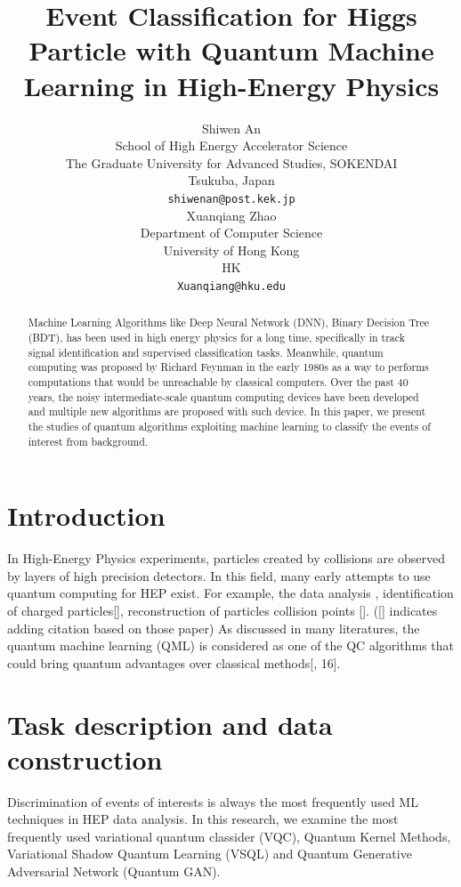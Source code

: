 \documentclass{article}
\title{Event Classification for Higgs Particle with Quantum Machine Learning in 
      High-Energy Physics}
\author{
 Shiwen An \\
  School of High Energy Accelerator Science\\
  The Graduate University for Advanced Studies, SOKENDAI\\
  Tsukuba, Japan \\
  \texttt{shiwenan@post.kek.jp} \\
   \And
  Xuanqiang Zhao \\
  Department of Computer Science\\
  University of Hong Kong\\
  HK \\
  \texttt{Xuanqiang@hku.edu} \\
}
\begin{document}
\maketitle
\begin{abstract}
Machine Learning Algorithms like Deep Neural Network (DNN), Binary Decision Tree (BDT), has been used in 
high energy physics for a long time, specifically in track signal identification and supervised classification tasks. 
Meanwhile, quantum computing was proposed by Richard Feynman in the early 1980s as a way to performs computations that 
would be unreachable by classical computers. Over the past 40 years, the noisy intermediate-scale quantum computing 
devices have been developed and multiple new algorithms are proposed with such device. In this paper, we present the 
studies of quantum algorithms exploiting machine learning to classify the events of interest from background.
\end{abstract}




\section{Introduction}
In High-Energy Physics experiments, particles created by collisions are observed by layers of high precision detectors.
In this field, many early attempts to use quantum computing for HEP exist. For example, the data analysis \cite{qml_task1}, identification
of charged particles[], reconstruction of particles collision points []. ([] indicates adding citation based on those paper) As discussed in 
many literatures, the quantum machine learning (QML) is considered as one of the QC algorithms that could bring quantum 
advantages over classical methods[\cite{qml_icepp}, 16].

\section{Task description and data construction}
Discrimination of events of interests is always the most frequently used ML techniques in HEP data analysis. 
In this research, we examine the most frequently used variational quantum classider (VQC), Quantum Kernel Methods, 
Variational Shadow Quantum Learning (VSQL) \cite{qml_vsql} and Quantum Generative Adversarial Network (Quantum GAN). 
\label{sec:headings}
\end{document}
